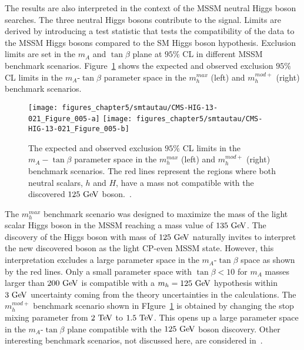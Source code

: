 The results are also interpreted in the context of the MSSM neutral Higgs boson searches. The three neutral Higgs bosons contribute to the signal.  Limits are derived by introducing a test statistic that tests the compatibility of the data to the MSSM Higgs bosons compared to the SM Higgs boson hypothesis. Exclusion limits are set in the $m_{A}$ and $\tan \beta$ plane at $95\%$ CL in different MSSM benchmark scenarios. Figure~\ref{fig:mssmlimit} shows the expected and observed exclusion $95\%$ CL limits in the $m_{A}$-$\tan\beta$ parameter space in the $m_h^{max}$ (left) and $m_{h}^{mod+}$ (right) benchmark scenarios.
\begin{figure}[htbp]
\centering
\texttt{[image: figures\_chapter5/smtautau/CMS-HIG-13-021\_Figure\_005-a]}
\texttt{[image: figures\_chapter5/smtautau/CMS-HIG-13-021\_Figure\_005-b]}
\caption{The expected and observed exclusion $95\%$ CL limits in the $m_{A}-\tan\beta$ parameter space in the $m_h^{max}$ (left) and $m_{h}^{mod+}$ (right) benchmark scenarios. The red lines represent the regions where both neutral scalars, $h$ and $H$, have a mass not compatible with the discovered $125~\mathrm{Ge\kern -0.1em V}$ boson.~\cite{Khachatryan:2014wca}.}
\label{fig:mssmlimit}
\end{figure}
The $m_{h}^{max}$ benchmark scenario was designed to maximize the mass of the light scalar Higgs boson in the MSSM reaching a mass value of $135~\mathrm{Ge\kern -0.1em V}$. The discovery of the Higgs boson with mass of $125~\mathrm{Ge\kern -0.1em V}$ naturally invites to interpret the new discovered boson as the light CP-even MSSM state. However, this interpretation excludes a large parameter space in the $m_{A}$-$\tan\beta$ space as shown by the red lines. Only a small parameter space with $\tan\beta<10$ for $m_{A}$ masses larger than $200~\mathrm{Ge\kern -0.1em V}$ is compatible with a $m_{h}=125~\mathrm{Ge\kern -0.1em V}$ hypothesis within $3~\mathrm{Ge\kern -0.1em V}$ uncertainty coming from the theory uncertainties in the calculations. The $m_{h}^{mod+}$ benchmark scenario shown in FIgure~\ref{fig:mssmlimit} is obtained by changing the stop mixing parameter from $2~\mathrm{Te\kern -0.1em V}$ to $1.5~\mathrm{Te\kern -0.1em V}$.  This opens up a large parameter space in the $m_{A}$-$\tan\beta$ plane compatible with the $125~\mathrm{Ge\kern -0.1em V}$ boson discovery. Other interesting benchmark scenarios, not discussed here,  are considered in~\cite{Khachatryan:2014wca}.